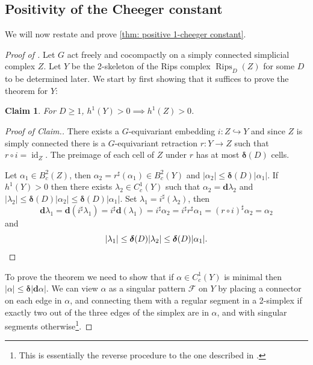 \documentclass{amsart}
\numberwithin{equation}{section}
\newtheorem{claim}[theorem]{Claim}
\theoremstyle{definition}
\newcommand{\bfd}{\mathbf{d}}
\newcommand{\calF}{\mathcal{F}}
\newcommand{\inj}{\hookrightarrow}
\newcommand{\bdelta}{{\boldsymbol\delta}}
\newcommand{\nir}[1]{\todo[inline, color=magenta]{#1}}
\DeclareMathOperator{\id}{id}
\DeclareMathOperator{\Rips}{Rips}
\begin{document}
\subsection*{Positivity of the Cheeger constant} \label{sec: theorem b}
We will now restate and prove \cref{thm: positive 1-cheeger constant}.

\cheegertheorem*

\begin{proof}[Proof of ]
Let $G$ act freely and cocompactly on a simply connected simplicial complex $Z$. 
Let $Y$ be the 2-skeleton of the Rips complex $\Rips_D(Z)$ for some $D$ to be determined later.
We start by first showing that it suffices to prove the theorem for $Y$:

\begin{claim}
    For $D\ge 1$,  $h^1(Y)>0 \implies  h^1(Z)>0$.
\end{claim}

\begin{proof}[Proof of Claim.]
There exists a $G$-equivariant embedding $i:Z \inj Y$ and since $Z$ is simply connected there is a $G$-equivariant retraction $r:Y\to Z$ such that $r\circ i=\id_{Z}$.
The preimage of each cell of $Z$ under $r$ has at most $\bdelta(D)$ cells.


Let $\alpha_1\in B_c^2(Z)$, then $\alpha_2= r^\sharp(\alpha_1)\in B_c^2(Y)$ and $|\alpha_2|\le \bdelta(D) |\alpha_1|$. 
If $h^1(Y)>0$ then there exists $\lambda_2\in C^1_c(Y)$ such that $\alpha_2=\bfd \lambda_2$ and $|\lambda_2|\le \bdelta(D) |\alpha_2|\le \bdelta(D) |\alpha_1|$.
Set $\lambda_1 = i^\sharp(\lambda_2)$, then $$\bfd \lambda _1 = \bfd(i^\sharp \lambda_1)=i^\sharp\bfd(\lambda_1)=i^\sharp \alpha_2 = i^\sharp r^\sharp \alpha_1 = (r\circ i)^\sharp\alpha_2=\alpha_2$$ and
$$|\lambda_1|\le \bdelta(D)|\lambda_2|\le \bdelta(D) |\alpha_1|.\qedhere$$
\end{proof}


To prove the theorem we need to show that if $\alpha\in C^1_c(Y)$ is minimal then $|\alpha|\le \bdelta |\bfd \alpha|$. 
We can view $\alpha$ as a singular pattern $\calF$ on $Y$ by placing a connector on each edge in $\alpha$, and connecting them with a regular segment in a 2-simplex if exactly two out of the three edges of the simplex are in $\alpha$, and with singular segments otherwise\footnote{This is essentially the reverse procedure to the one described in .}.


\end{proof}
\end{document}
